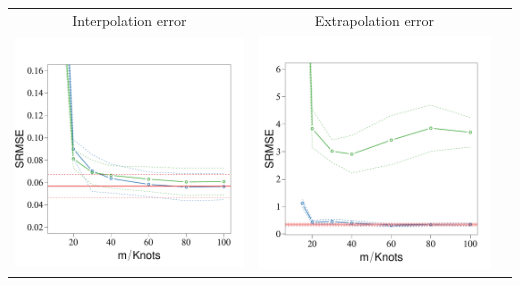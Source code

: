 \documentclass[8pt]{beamer} %
\begin{document}
\begin{frame}

\begin{center}
\begin{tabular}{c c c }
\hspace{5mm} \scriptsize Interpolation error & \hspace{4mm} \scriptsize Extrapolation error & \\[-3mm]
%
\includegraphics[scale=0.24, trim = 0mm 0mm 10mm 10mm, clip]{ch5_fig11_MSE_exI_inter.pdf} & \hspace{-4mm} \includegraphics[scale=0.24, trim = 0mm 0mm 10mm 10mm, clip]{ch5_fig11_MSE_exI_extra.pdf} & \hspace{-4mm}

\end{tabular}
\end{center}
\end{frame}
\end{document}
